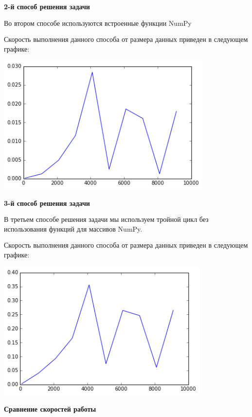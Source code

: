 \documentclass[12pt, a4paper]{article}
\begin{document}
			{\bf 2-й способ решения задачи\\}

				Во втором способе используются встроенные функции NumPy

				Скорость выполнения данного способа от размера данных приведен в следующем графике:
				\begin{center}
					\includegraphics[height=7cm]{timeit/num7_ti2.png}
				\end{center}


			{\bf 3-й способ решения задачи\\}

				В третьем способе решения задачи мы используем тройной цикл без использования функций для массивов NumPy.

				Скорость выполнения данного способа от размера данных приведен в следующем графике:
				\begin{center}
					\includegraphics[height=7cm]{timeit/num7_ti3.png}
				\end{center}


			{\bf Сравнение скоростей работы\\}
\end{document}
